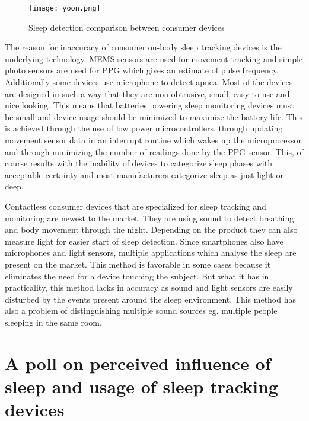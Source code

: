 \begin{figure}[h]
  \begin{center}
    \texttt{[image: yoon.png]}
  \end{center}
  \caption{Sleep detection comparison between consumer devices}
  \label{fig:yoon}
\end{figure}

The reason for inaccuracy of consumer on-body sleep tracking devices is the underlying technology. \ac{MEMS} sensors are used for movement tracking and simple photo sensors are used for \ac{PPG} which gives an estimate of pulse frequency. Additionally some devices use microphone to detect apnea. Most of the devices are designed in such a way that they are non-obtrusive, small, easy to use and nice looking. This means that batteries powering sleep monitoring devices must be small and device usage should be minimized to maximize the battery life. This is achieved through the use of low power microcontrollers, through updating movement sensor data in an interrupt routine which wakes up the microprocessor and through minimizing the number of readings done by the \ac{PPG} sensor. This, of course results with the inability of devices to categorize sleep phases with acceptable certainty and most manufacturers categorize sleep as just light or deep.

Contactless consumer devices that are specialized for sleep tracking and monitoring are newest to the market. They are using sound to detect breathing and body movement through the night. Depending on the product they can also measure light for easier start of sleep detection. Since smartphones also have microphones and light sensors, multiple applications which analyse the sleep are present on the market. This method is favorable in some cases because it eliminates the need for a device touching the subject. But what it has in practicality, this method lacks in accuracy as sound and light sensors are easily disturbed by the events present around the sleep environment. This method has also a problem of distinguishing multiple sound sources eg. multiple people sleeping in the same room.


\section{A poll on perceived influence of sleep and usage of sleep tracking devices}

